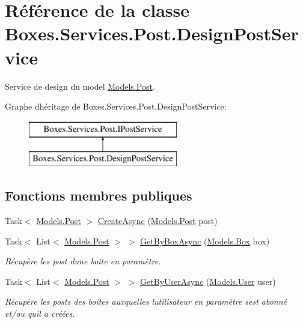 \hypertarget{class_boxes_1_1_services_1_1_post_1_1_design_post_service}{}\section{Référence de la classe Boxes.\+Services.\+Post.\+Design\+Post\+Service}
\label{class_boxes_1_1_services_1_1_post_1_1_design_post_service}


Service de design du model \hyperlink{class_boxes_1_1_models_1_1_post}{Models.\+Post}.  


Graphe d\textquotesingle{}héritage de Boxes.\+Services.\+Post.\+Design\+Post\+Service\+:\begin{figure}[H]
\begin{center}
\leavevmode
\includegraphics[height=2.000000cm]{class_boxes_1_1_services_1_1_post_1_1_design_post_service}
\end{center}
\end{figure}
\subsection*{Fonctions membres publiques}
\begin{DoxyCompactItemize}
\item 
Task$<$ \hyperlink{class_boxes_1_1_models_1_1_post}{Models.\+Post} $>$ \hyperlink{class_boxes_1_1_services_1_1_post_1_1_design_post_service_acc006b582ba20352816a2a3c04f58f57}{Create\+Async} (\hyperlink{class_boxes_1_1_models_1_1_post}{Models.\+Post} post)
\item 
Task$<$ List$<$ \hyperlink{class_boxes_1_1_models_1_1_post}{Models.\+Post} $>$ $>$ \hyperlink{class_boxes_1_1_services_1_1_post_1_1_design_post_service_a13733d14a56f618f93abed97aece7a67}{Get\+By\+Box\+Async} (\hyperlink{class_boxes_1_1_models_1_1_box}{Models.\+Box} box)
\begin{DoxyCompactList}\small\item\em Récupère les post d\textquotesingle{}une boite en paramètre.  \end{DoxyCompactList}\item 
Task$<$ List$<$ \hyperlink{class_boxes_1_1_models_1_1_post}{Models.\+Post} $>$ $>$ \hyperlink{class_boxes_1_1_services_1_1_post_1_1_design_post_service_afbd34f884dcc265524f55636448e581b}{Get\+By\+User\+Async} (\hyperlink{class_boxes_1_1_models_1_1_user}{Models.\+User} user)
\begin{DoxyCompactList}\small\item\em Récupère les posts des boites auxquelles l\textquotesingle{}utilisateur en paramètre s\textquotesingle{}est abonné et/ou qu\textquotesingle{}il a créées.  \end{DoxyCompactList}\end{DoxyCompactItemize}


